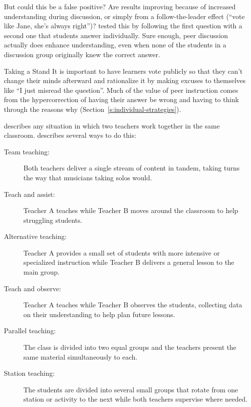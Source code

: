 But could this be a false positive? Are results improving because of
increased understanding during discussion, or simply from a
follow-the-leader effect (``vote like Jane, she's always right'')?
\cite{Smit2009} tested this by following the first question with a
second one that students answer individually. Sure enough, peer
discussion actually does enhance understanding, even when none of the
students in a discussion group originally knew the correct answer.

\begin{aside}{Taking a Stand}
  It is important to have learners vote publicly so that they can't
  change their minds afterward and rationalize it by making excuses to
  themselves like ``I just misread the question''. Much of the value of
  peer instruction comes from the hypercorrection of having their answer
  be wrong and having to think through the reasons why
  (Section~\ref{s:individual-strategies}).
\end{aside}


 describes any situation in
which two teachers work together in the same classroom.
\cite{Frie2016} describes several ways to do this:

\begin{description}
\item[Team teaching:]
Both teachers deliver a single stream of content in tandem, taking
turns the way that musicians taking solos would.
\item[Teach and assist:]
Teacher A teaches while Teacher B moves around the classroom to help
struggling students.
\item[Alternative teaching:]
Teacher A provides a small set of students with more intensive or
specialized instruction while Teacher B delivers a general lesson to
the main group.
\item[Teach and observe:]
Teacher A teaches while Teacher B observes the students, collecting
data on their understanding to help plan future lessons.
\item[Parallel teaching:]
The class is divided into two equal groups and the teachers present
the same material simultaneously to each.
\item[Station teaching:]
The students are divided into several small groups that rotate from
one station or activity to the next while both teachers supervise
where needed.
\end{description}

